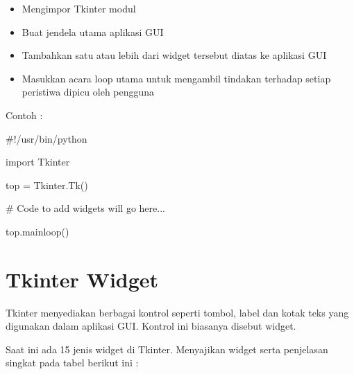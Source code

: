 \documentclass{wileySix}
\begin{document}
\begin{myEnumerate}
{\begin{itemize}
\section{Tkinter Pemrograman}
\par
Tkinter adalah perpustakaan GUI standar untuk Python. Python bila dikombinasikan dengan Tkinter menyediakan cara yang mudah dan cepat untuk membuat aplikasi GUI. Tkinter menyediakan antarmuka berorientasi ojek yang kuat untuk toolkit Tk GUI. \par
\noindent 
\hspace*{0.5in} Membuat aplikasi GUI menggunakan Tkinter adalah tugas yang mudah. Yang diperlukan adalah melakukan langkah-langkah sebagai berikut : \par
\noindent 
\item Mengimpor Tkinter modul \par
\noindent 
\item Buat jendela utama aplikasi GUI \par
\noindent 
\item Tambahkan satu atau lebih dari widget tersebut diatas ke aplikasi GUI \par
\noindent 
\item Masukkan acara loop utama untuk mengambil tindakan terhadap setiap peristiwa dipicu oleh pengguna\end{itemize}
\par
\noindent 
\vspace{12pt}
\vspace{12pt}
\noindent 
Contoh : \par
\noindent 
{\fontsize{10pt}{10pt}\selectfont  $  \#  $!/usr/bin/python} \par
\vspace{10pt}
\noindent 
{\fontsize{10pt}{10pt}\selectfont import Tkinter} \par
\noindent 
{\fontsize{10pt}{10pt}\selectfont top = Tkinter.Tk()} \par
\noindent 
{\fontsize{10pt}{10pt}\selectfont   $  \#  $ Code to add widgets will go here...} \par
\noindent 
{\fontsize{10pt}{10pt}\selectfont top.mainloop()} \par
\vspace{10pt}
\noindent 

\section{Tkinter Widget}
\par
\noindent 
\hspace*{0.5in} Tkinter menyediakan berbagai kontrol seperti tombol, label dan kotak teks yang digunakan dalam aplikasi GUI. Kontrol ini biasanya disebut widget.  \par
\noindent 
\hspace*{0.5in} Saat ini ada 15 jenis widget di Tkinter. Menyajikan widget serta penjelasan singkat pada tabel berikut ini : \par


}
\end{myEnumerate}
\end{document}
